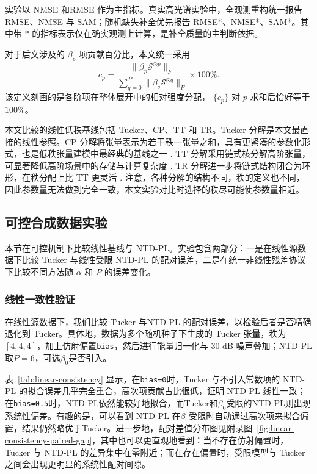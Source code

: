 实验以 NMSE 和RMSE 作为主指标。真实高光谱实验中，全观测重构统一报告 RMSE、NMSE 与 SAM；随机缺失补全优先报告 RMSE*、NMSE*、SAM*。其中带 $*$ 的指标表示仅在确实观测上计算，是补全质量的主判断依据。

对于后文涉及的 $\beta_p$ 项贡献百分比，本文统一采用
\begin{equation}
c_p
=
\frac{\|\beta_p \mathcal S^{\odot p}\|_F}{\sum_{q=0}^{P}\|\beta_q \mathcal S^{\odot q}\|_F}\times 100\%.
\label{eq:beta-contribution}
\end{equation}
该定义刻画的是各阶项在整体展开中的相对强度分配， $\{c_p\}$ 对 $p$ 求和后恰好等于 $100\%$。

本文比较的线性低秩基线包括 Tucker、CP、TT 和 TR。Tucker 分解是本文最直接的线性参照。CP 分解将张量表示为若干秩一张量之和，具有更紧凑的参数化形式，也是低秩张量建模中最经典的基线之一 \cite{kolda2009tensor}. TT 分解采用链式核分解高阶张量，可显著降低高阶场景中的存储与计算复杂度 \cite{oseledets2011}. TR 分解进一步将链式结构闭合为环形，在秩分配上比 TT 更灵活 \cite{zhao2016tr}. 注意，各种分解的结构不同，秩的定义也不同，因此参数量无法做到完全一致，本文实验对比时选择的秩尽可能使参数量相近。

\subsection{可控合成数据实验}
\label{sec:exp-syn}

本节在可控机制下比较线性基线与 NTD-PL。实验包含两部分：一是在线性源数据下比较 Tucker 与线性受限 NTD-PL 的配对误差，二是在统一非线性残差协议下比较不同方法随 $\alpha$ 和 $P$ 的误差变化。

\subsubsection{线性一致性验证}
\label{sec:linear-consistency}

在线性源数据下，我们比较 Tucker 与NTD-PL 的配对误差，以检验后者是否精确退化到 Tucker。具体地，数据为多个随机种子下生成的 Tucker 张量，秩为 $[4,4,4]$，加上仿射偏置\texttt{bias}，然后进行能量归一化与 $30$ dB 噪声叠加；NTD-PL 取$P=6$，可选$\beta_0$是否引入。

表~\ref{tab:linear-consistency} 显示，在\texttt{bias=0}时，Tucker 与不引入常数项的 NTD-PL 的拟合误差几乎完全重合，高次项贡献占比很低，证明 NTD-PL 线性一致；在\texttt{bias=0.5}时，NTD-PL依然能较好地拟合，而Tucker和$\beta_0$受限的NTD-PL则出现系统性偏差。有趣的是，可以看到 NTD-PL 在$\beta_0$受限时自动通过高次项来拟合偏置，结果仍然略优于Tucker。进一步地，配对差值分布图见附录图~\ref{fig:linear-consistency-paired-gap}，其中也可以更直观地看到：当不存在仿射偏置时，Tucker 与 NTD-PL 的差异集中在零附近；而在存在偏置时，受限模型与 Tucker 之间会出现更明显的系统性配对间隙。

